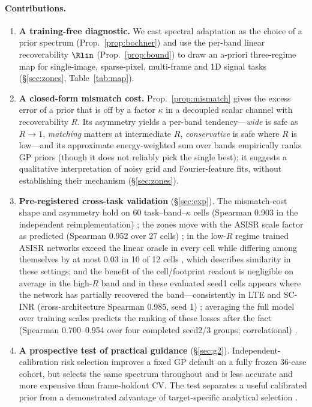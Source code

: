 \paragraph{Contributions.}
\begin{enumerate}
\item \textbf{A training-free diagnostic.} We cast spectral adaptation as the
choice of a prior spectrum (Prop.~\ref{prop:bochner}) and use the per-band
linear recoverability $\Rlin$ (Prop.~\ref{prop:bound}) to draw an a-priori
three-regime map for single-image, sparse-pixel, multi-frame and 1D signal
tasks (\S\ref{sec:zones}, Table~\ref{tab:map}).
\item \textbf{A closed-form mismatch cost.} Prop.~\ref{prop:mismatch} gives
the excess error of a prior that is off by a factor $\kappa$ in a decoupled scalar channel with
recoverability $R$. Its asymmetry yields a per-band tendency---\emph{wide} is safe as $R\to1$,
\emph{matching} matters at intermediate $R$, \emph{conservative} is safe where
$R$ is low---and its approximate energy-weighted sum over bands empirically ranks GP priors
(though it does not reliably pick the single best); it suggests a qualitative interpretation of noisy grid and Fourier-feature fits, without establishing their mechanism (\S\ref{sec:zones}).
\item \textbf{Pre-registered cross-task validation} (\S\ref{sec:exp}).
The mismatch-cost shape and asymmetry hold on 60 task--band--$\kappa$ cells
(Spearman 0.903 in the independent reimplementation) ; the zones move with the ASISR scale factor as
predicted (Spearman 0.952 over 27 cells) ; in the low-$R$
regime trained ASISR networks exceed the linear oracle in every cell while
differing among themselves by at most 0.03 in 10 of 12 cells ,
which describes similarity in these settings; and the benefit of the cell/footprint
readout is negligible on average in the high-$R$ band and in these evaluated seed1 cells appears where the network has
partially recovered the band---consistently in LTE and SC-INR
(cross-architecture Spearman 0.985, seed 1) ; averaging the full model
over training scales predicts the ranking of these losses after the fact
(Spearman 0.700--0.954 over four completed seed2/3 groups; correlational) .
\item \textbf{A prospective test of practical guidance}
(\S\ref{sec:g2}). Independent-calibration risk selection improves a fixed
GP default on a fully frozen 36-case cohort, but selects the same spectrum
throughout and is less accurate and more expensive than frame-holdout CV.
The test separates a useful calibrated prior from a demonstrated advantage
of target-specific analytical selection .
\end{enumerate}

